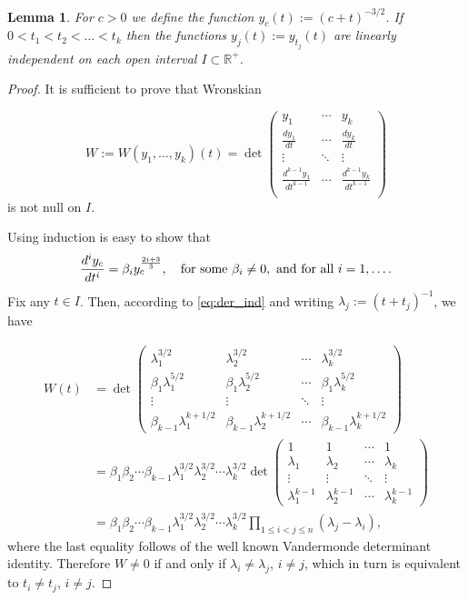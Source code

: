 \documentclass[twoside]{article}
\newtheorem{lem}[thm]{Lemma}
\theoremstyle{remark}
\begin{document}
\begin{lem}\label{lem:1} For $c>0$ we define the function $y_c(t):=(c+t)^{-3/2}$. If $0<t_1<t_2<\ldots<t_k$ then the functions $y_j(t):=y_{t_j}(t)$  are linearly independent on  each open interval   $I\subset \mathbb{R}^+$.
\end{lem}
\begin{proof} It is sufficient to prove that Wronskian

 \[W:=W(y_1,\ldots,y_k)(t)=\det\begin{pmatrix}
			      y_1 & \cdots & y_k\\
			      \frac{dy_1}{dt}&  \cdots & \frac{dy_k}{dt}\\
			      \vdots & \ddots & \vdots \\
			      \frac{d^{k-1}y_1}{dt^{k-1}}&  \cdots & \frac{d^{k-1}y_k}{dt^{k-1}}\\
                           \end{pmatrix}
\]
is not null on $I$.

Using induction is easy to show that
\begin{equation}\label{eq:der_ind}\frac{d^iy_c}{dt^i}=\beta_{i}y_{c}^{\frac{2i+3}{3}},\quad\hbox{for some }\beta_{i}\neq 0, \hbox{ and for all }i=1,\ldots.
\end{equation}
Fix any $t\in I$. Then, according to \eqref{eq:der_ind} and writing $\lambda_j:=(t+t_j)^{-1}$, we have

\[
\begin{split}
  W(t)&=\det
    \begin{pmatrix}
      \lambda_1^{3/2} & \lambda_2^{3/2} &\cdots & \lambda_k^{3/2} \\
      \beta_1\lambda_1^{5/2} &\beta_1 \lambda_2^{5/2} &\cdots &\beta_1 \lambda_k^{5/2}\\
      \vdots & \vdots &\ddots & \vdots\\
      \beta_{k-1}\lambda_1^{k+1/2} & \beta_{k-1}\lambda_2^{k+1/2} &\cdots & \beta_{k-1}\lambda_k^{k+1/2}
    \end{pmatrix}
  \\
  &= \beta_1\beta_2\cdots\beta_{k-1} \lambda_1^{3/2}\lambda_2^{3/2}\cdots \lambda_k^{3/2}
     \det \begin{pmatrix}
      1& 1 &\cdots & 1 \\
      \lambda_1 & \lambda_2 &\cdots & \lambda_k\\
      \vdots & \vdots &\ddots & \vdots\\
      \lambda_1^{k-1} & \lambda_2^{k-1} &\cdots & \lambda_k^{k-1}
    \end{pmatrix}
  \\
  &= \beta_1\beta_2\cdots\beta_{k-1} \lambda_1^{3/2}\lambda_2^{3/2}\cdots \lambda_k^{3/2}
  \prod_{1\leq i<j\leq n}(\lambda_j-\lambda_i)
,
\end{split}
\]
where the last equality follows of the well known Vandermonde determinant identity. Therefore $W\neq 0$ if and only if $\lambda_i\neq\lambda_j$, $i\neq j$,
which in turn is equivalent to $t_i\neq t_j$, $i\neq j$.
\end{proof}
\end{document}
